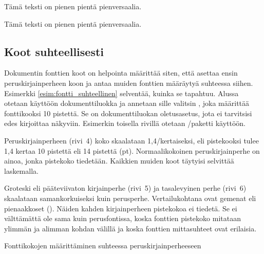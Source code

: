 \pagebreak[3]

\begin{koodilohkosis}
  \begin{footnotesize}
    \begin{scshape}
      Tämä teksti on pienen pientä pienversaalia.
    \end{scshape}
  \end{footnotesize}
\end{koodilohkosis}

\begin{tulossis}
  \begin{footnotesize}
    \begin{scshape}
      Tämä teksti on pienen pientä pienversaalia.
    \end{scshape}
  \end{footnotesize}
\end{tulossis}

\pagebreak[3]

\subsection{Koot suhteellisesti}
\label{luku:fontti_suhteellinen}

Dokumentin fonttien koot on helpointa määrittää siten, että asettaa
ensin peruskirjainperheen koon ja antaa muiden fonttien määräytyä
suhteessa siihen. Esimerkki \ref{esim:fontti_suhteellinen} selventää,
kuinka se tapahtuu. Alussa otetaan käyttöön dokumenttiluokka
 ja annetaan sille valitsin \koodi{10pt}, joka määrittää
fonttikooksi 10 pistettä. Se on dokumenttiluokan ole\-tus\-ase\-tus,
jota ei tarvitsisi edes kirjoittaa näkyviin. Esimerkin toisella rivillä
otetaan \-/paketti käyttöön.

Peruskirjainperheen (rivi~4) koko skaalataan 1,4\-/kertaiseksi, eli
pistekooksi tulee 1,4 kertaa 10 pistettä eli 14 pistettä (pt).
Normaalikokoinen peruskirjainperhe on ainoa, jonka pistekoko tiedetään.
Kaikkien muiden koot täytyisi selvittää laskemalla.

Groteski eli pääteviivaton kirjainperhe (rivi~5) ja tasalevyinen perhe
(rivi~6) skaalataan samankorkuiseksi kuin perusperhe. Vertailukohtana
ovat gemenat eli pienaakkoset (). Näiden kahden
kirjainperheen pistekokoa ei tiedetä. Se ei välttämättä ole sama kuin
perusfontissa, koska fonttien pistekoko mitataan ylimmän ja alimman
kohdan välillä ja koska fonttien mittasuhteet ovat erilaisia.

\begin{esimerkki*}
\caption{Fonttikokojen määrittäminen suhteessa peruskirjainperheeseen}
\label{esim:fontti_suhteellinen}
\end{esimerkki*}

